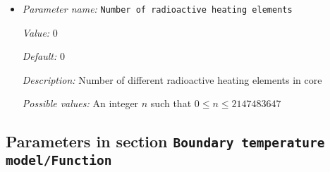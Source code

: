 \begin{itemize}
{\it Possible values:} A list of 0 to 4294967295 elements where each element is [A floating point number $v$ such that $-\text{MAX\_DOUBLE} \leq v \leq \text{MAX\_DOUBLE}$]
\item {\it Parameter name:} {\tt Number of radioactive heating elements}
\label{parameters:Boundary temperature model/Dynamic core/Radioactive heat source/Number of radioactive heating elements}


{\it Value:} 0


{\it Default:} 0


{\it Description:} Number of different radioactive heating elements in core


{\it Possible values:} An integer $n$ such that $0\leq n \leq 2147483647$
\end{itemize}

\subsection{Parameters in section \tt Boundary temperature model/Function}
\label{parameters:Boundary_20temperature_20model/Function}

